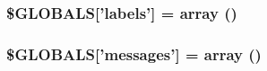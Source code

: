 \subsubsection[{\$GLOBALS}]{\setlength{\rightskip}{0pt plus 5cm}\$GLOBALS\mbox{[}'labels'\mbox{]} = array ()}\label{OWLloader_8php_a49e8feb96fae9cb6655df44ebad3ca2b}
\subsubsection[{\$GLOBALS}]{\setlength{\rightskip}{0pt plus 5cm}\$GLOBALS\mbox{[}'messages'\mbox{]} = array ()}\label{OWLloader_8php_a65f2996116eed36e9ab25f254a470259}
